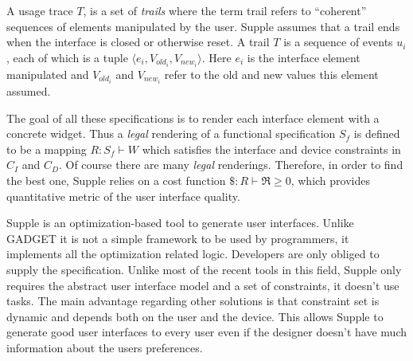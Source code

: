 A usage trace $T$, is a set of \textit{trails} where the term trail refers to ``coherent'' sequences of elements manipulated by the user. Supple assumes that a trail ends when the interface is closed or otherwise reset. A trail $T$ is a sequence of events $u_{i}$, each of which is a tuple $ \langle e_{i}, V_{old_{i}}, V_{new_{i}} \rangle $. Here $e_{i}$ is the interface element manipulated and $V_{old_{i}}$ and $V_{new_{i}}$ refer to the old and new values this element assumed.

The goal of all these specifications is to render each interface element with a concrete widget. Thus a \textit{legal} rendering of a functional specification $S_{f}$ is defined to be a mapping $R: S_{f} \vdash W$ which satisfies the interface and device constraints in $C_{I}$ and $C_{D}$. Of course there are many \textit{legal} renderings. Therefore, in order to find the best one, Supple relies on a cost function $\$: R \vdash \Re \geq 0$, which provides quantitative metric of the user interface quality.

Supple is an optimization-based tool to generate user interfaces. Unlike GADGET it is not a simple framework to be used by programmers, it implements all the optimization related logic. Developers are only obliged to supply the specification. Unlike most of the recent tools in this field, Supple only requires the abstract user interface model and a set of constraints, it doesn't use tasks. The main advantage regarding other solutions is that constraint set is dynamic and depends both on the user and the device. This allows Supple to generate good user interfaces to every user even if the designer doesn't have much information about the users preferences.